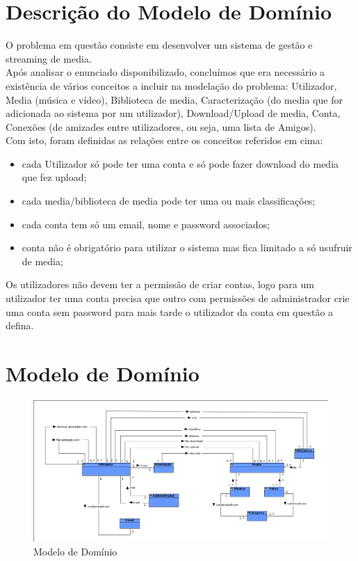\documentclass[a4paper]{report}
\begin{document}
\section{Descrição do Modelo de Domínio}
O problema em questão consiste em desenvolver um sistema de gestão e streaming
de media.\\
Após analisar o enunciado disponibilizado, concluímos que era necessário a
existência de vários conceitos a incluir na modelação do problema: Utilizador,
Media (música e vídeo), Biblioteca de media, Caracterização (do media que for
adicionada ao sistema por um utilizador), Download/Upload de media, Conta,
Conexões (de amizades entre utilizadores, ou seja, uma lista de Amigos).\\
Com isto, foram definidas as relações entre os conceitos referidos em cima:
\begin{itemize}
    \item cada Utilizador só pode ter uma conta e só pode fazer download do
        media que fez upload;
    \item cada media/biblioteca de media pode ter uma ou mais classificações;
    \item cada conta tem só um email, nome e password associados;
    \item conta não é obrigatório para utilizar o sistema mas fica limitado 
        a só usufruir de media;
\end{itemize}
Os utilizadores não devem ter a permissão de criar contas, logo para um
utilizador ter uma conta precisa que outro com permissões de administrador crie
uma conta sem password para mais tarde o utilizador da conta em questão a
defina.

\section{Modelo de Domínio}
\begin{figure}[H]
	\centering 
    \includegraphics[width=\textwidth]{images/Dominio.png}  
    \caption{Modelo de Domínio}
\end{figure}
\end{document}
